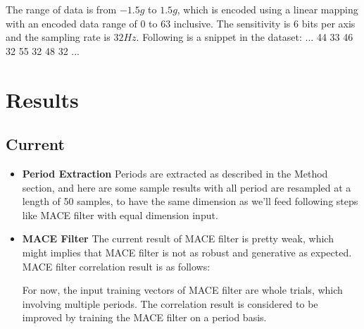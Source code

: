 \documentclass[10pt,twocolumn,letterpaper]{article}
\begin{document}
The range of data is from $-1.5g$ to $1.5g$, which is encoded using a linear mapping with an encoded data range of 0 to 63 inclusive. The sensitivity is 6 bits per axis and the sampling rate is $32Hz$. Following is a snippet in the dataset:\newline
... 44 33 46 32 55 32 48 32\newline
...\newline

\section{Results}
\subsection{Current}
    \begin{itemize}
    \item \textbf{Period Extraction}\newline
    Periods are extracted as described in the Method section, and here are some sample results with all period are resampled at a length of 50 samples, to have the same dimension as we’ll feed following steps like MACE filter with equal dimension input.

\begin{figure}[t]
\begin{center}
\fbox{\rule{0pt}{2in} \rule{0.9\linewidth}{0pt}}
   \caption{}
\end{center}
\end{figure}

\begin{figure}[t]
\begin{center}
\fbox{\rule{0pt}{2in} \rule{0.9\linewidth}{0pt}}
   \caption{}
\end{center}
\end{figure}
\item \textbf{MACE Filter}\newline
The current result of MACE filter is pretty weak, which might implies that MACE filter is not as robust and generative as expected. MACE filter correlation result is as follows:

\begin{figure}[t]
\begin{center}
\fbox{\rule{0pt}{2in} \rule{0.9\linewidth}{0pt}}
   \caption{}
\end{center}
\end{figure}

For now, the input training vectors of MACE filter are whole trials, which involving multiple periods. The correlation result is considered to be improved by training the MACE filter on a period basis.
    \end{itemize}
\end{document}
